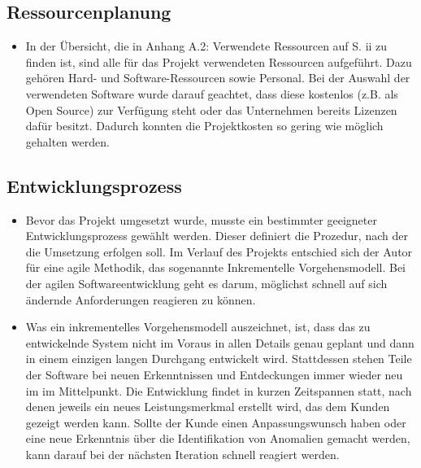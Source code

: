 \subsection{Ressourcenplanung}
\label{sec:Ressourcenplanung}

\begin{itemize}
	\item In der Übersicht, die in Anhang A.2: Verwendete Ressourcen auf S. ii zu finden ist, sind alle für das Projekt verwendeten Ressourcen aufgeführt. 
	Dazu gehören Hard- und Software-Ressourcen sowie Personal. 
    Bei der Auswahl der verwendeten Software wurde darauf geachtet, dass diese kostenlos (z.B. als Open Source) zur Verfügung steht oder das Unternehmen bereits Lizenzen dafür besitzt. 
	Dadurch konnten die Projektkosten so gering wie möglich gehalten werden.
\end{itemize}


\subsection{Entwicklungsprozess}
\label{sec:Entwicklungsprozess}
\begin{itemize}
	\item Bevor das Projekt umgesetzt wurde, musste ein bestimmter geeigneter Entwicklungsprozess gewählt werden. Dieser definiert die Prozedur, nach der die Umsetzung erfolgen soll.
	Im Verlauf des Projekts entschied sich der Autor für eine agile Methodik, das sogenannte Inkrementelle Vorgehensmodell. Bei der agilen
	Softwareentwicklung geht es darum, möglichst schnell auf sich ändernde Anforderungen reagieren zu können.
	
	\item Was ein inkrementelles Vorgehensmodell auszeichnet, ist, dass das zu entwickelnde System nicht im Voraus in allen Details genau geplant und dann in einem einzigen langen Durchgang entwickelt wird. 
	Stattdessen stehen Teile der Software bei neuen Erkenntnissen und Entdeckungen immer wieder neu im im Mittelpunkt.
	Die Entwicklung findet in kurzen Zeitspannen statt, nach denen jeweils ein neues Leistungsmerkmal erstellt wird, das dem Kunden gezeigt werden kann.
	Sollte der Kunde einen Anpassungswunsch haben oder eine neue Erkenntnis über die Identifikation von Anomalien gemacht werden,
	kann darauf bei der nächsten Iteration schnell reagiert werden.
\end{itemize}
